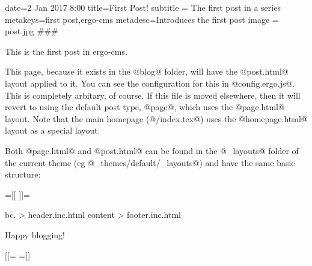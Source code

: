 date=2 Jan 2017 8:00
title=First Post!
subtitle = The first post in a series
metakeys=first post,ergo-cms
metadesc=Introduces the first post
image = post.jpg
###

This is the first post in ergo-cms. 

This page, because it exists in the @blog@ folder, will have the @post.html@ layout applied to it. You can see the configuration for this in @config.ergo.js@. This is completely arbitary, of course. If this file is moved elsewhere, then it will revert to using the default post type, @page@, which uses the @page.html@ layout. Note that the main homepage (@/index.tex@) uses the @homepage.html@ layout as a special layout.

Both @page.html@ and @post.html@ can be found in the @_layouts@ folder of the current theme (eg @_themes/default/_layouts@) and have the same basic structure:

{{=[[ ]]=}}

bc. {{> header.inc.html}}
{{{content}}}
{{> footer.inc.html}}

Happy blogging!

[[={{ }}=]]

